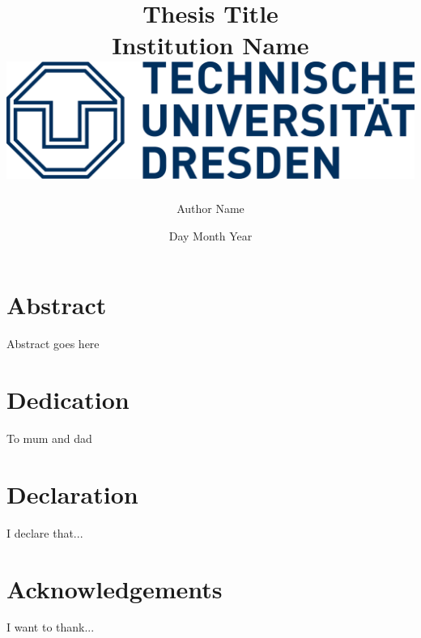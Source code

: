 \documentclass[12pt]{report}
\title{
    {Thesis Title}\\
    {\large Institution Name}\\
    {\includegraphics{2000px-Logo_TU_Dresden.svg_-2709348343.png}}
}
\author{Author Name}
\date{Day Month Year}
\begin{document}
    \maketitle

    \chapter*{Abstract}
    Abstract goes here

    \chapter*{Dedication}
    To mum and dad

    \chapter*{Declaration}
    I declare that...
    
    \chapter*{Acknowledgements}
    I want to thank...

    \tableofcontents
\end{document}
